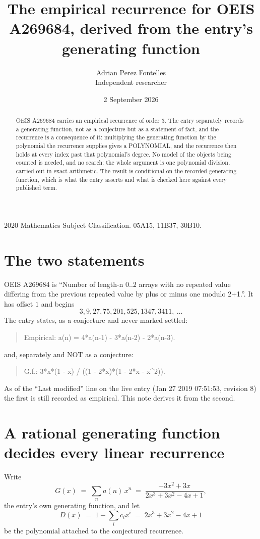 \documentclass[11pt,a4paper]{article}
\title{The empirical recurrence for OEIS A269684, derived from the entry's generating function}
\author{Adrian Perez Fontelles\\ \small Independent researcher}
\date{2 September 2026}
\theoremstyle{plain}
\theoremstyle{definition}
\begin{document}
\maketitle

\begin{abstract}
OEIS A269684 carries an empirical recurrence of order $3$. The entry separately records a
generating function, not as a conjecture but as a statement of fact, and the recurrence is a
consequence of it: multiplying the generating function by the polynomial the recurrence
supplies gives a POLYNOMIAL, and the recurrence then holds at every index past that
polynomial's degree. No model of the objects being counted is needed, and no search: the
whole argument is one polynomial division, carried out in exact arithmetic. The result is
conditional on the recorded generating function, which is what the entry asserts and what is
checked here against every published term.
\end{abstract}

\noindent\small 2020 Mathematics Subject Classification. 05A15, 11B37, 30B10.\normalsize

\section{The two statements}

OEIS A269684 is ``Number of length-n 0..2 arrays with no repeated value differing from the previous repeated value by plus or minus one modulo 2+1.''. It has offset $1$ and begins
\[
3, 9, 27, 75, 201, 525, 1347, 3411,\ \dots
\]
The entry states, as a conjecture and never marked settled:
\begin{quote}
Empirical: a(n) = 4*a(n-1) - 3*a(n-2) - 2*a(n-3).
\end{quote}
and, separately and NOT as a conjecture:
\begin{quote}
G.f.: 3*x*(1 - x) / ((1 - 2*x)*(1 - 2*x - x\^{}2)).
\end{quote}
As of the ``Last modified'' line on the live entry (Jan 27 2019 07:51:53, revision 8) the first is still
recorded as empirical. This note derives it from the second.

\section{A rational generating function decides every linear recurrence}

Write
\[
G(x)\;=\;\sum_{n}a(n)\,x^{n}\;=\;\frac{- 3 x^{2} + 3 x}{2 x^{3} + 3 x^{2} - 4 x + 1},
\]
the entry's own generating function, and let
\[
D(x)\;=\;1-\sum_i c_i x^{i}\;=\;2 x^{3} + 3 x^{2} - 4 x + 1
\]
be the polynomial attached to the conjectured recurrence.
\end{document}
